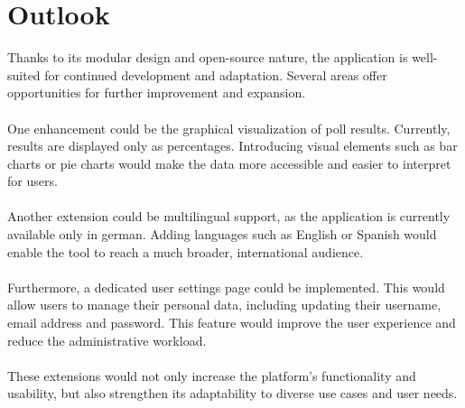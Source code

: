 \documentclass[a4paper,12pt]{report}
\begin{document}
\section{Outlook}
Thanks to its modular design and open-source nature, the application is well-suited for continued development and adaptation. Several areas offer opportunities for further improvement and expansion. \\\\
One enhancement could be the graphical visualization of poll results. Currently, results are displayed only as percentages. Introducing visual elements such as bar charts or pie charts would make the data more accessible and easier to interpret for users. \\\\
Another extension could be multilingual support, as the application is currently available only in german. Adding languages such as English or Spanish would enable the tool to reach a much broader, international audience. \\\\
Furthermore, a dedicated user settings page could be implemented. This would allow users to manage their personal data, including updating their username, email address and password. This feature would improve the user experience and reduce the administrative workload. \\\\
These extensions would not only increase the platform's functionality and usability, but also strengthen its adaptability to diverse use cases and user needs.


\cleardoublepage
{}
\printbibliography

\cleardoublepage
{}
\listoffigures
\end{document}
